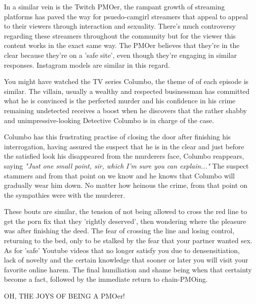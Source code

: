\documentclass[easypeasy.tex]{subfiles}
\begin{document}
In a similar vein is the Twitch PMOer, the rampant growth of streaming platforms has paved the way for psuedo-camgirl streamers that appeal to appeal to their viewers through interaction and sexuality. There's much controversy regarding these streamers throughout the community but for the viewer this content works in the exact same way. The PMOer believes that they're in the clear because they're on a 'safe site', even though they're engaging in similar responses. Instagram models are similar in this regard.

You might have watched the TV series Columbo, the theme of of each episode is similar. The villain, usually a wealthy and respected businessman has committed what he is convinced is the perfected murder and his confidence in his crime remaining undetected receives a boost when he discovers that the rather shabby and unimpressive-looking Detective Columbo is in charge of the case.

Columbo has this frustrating practise of closing the door after finishing his interrogation, having assured the suspect that he is in the clear and just before the satisfied look his disappeared from the murderers face, Columbo reappears, saying \textit{"Just one small point, sir, which I'm sure you can explain..."} The suspect stammers and from that point on we know and he knows that Columbo will gradually wear him down. No matter how heinous the crime, from that point on the sympathies were with the murderer.

These bouts are similar, the tension of not being allowed to cross the red line to get the porn fix that they 'rightly deserved', then wondering where the pleasure was after finishing the deed. The fear of crossing the line and losing control, returning to the bed, only to be stalked by the fear that your partner wanted sex. As for 'safe' Youtube videos that no longer satisfy you due to densensitiation, lack of novelty and the certain knowledge that sooner or later you will visit your favorite online harem. The final humiliation and shame being when that certainty become a fact, followed by the immediate return to chain-PMOing.

{\huge OH, THE JOYS OF BEING A PMOer!}
\end{document}
